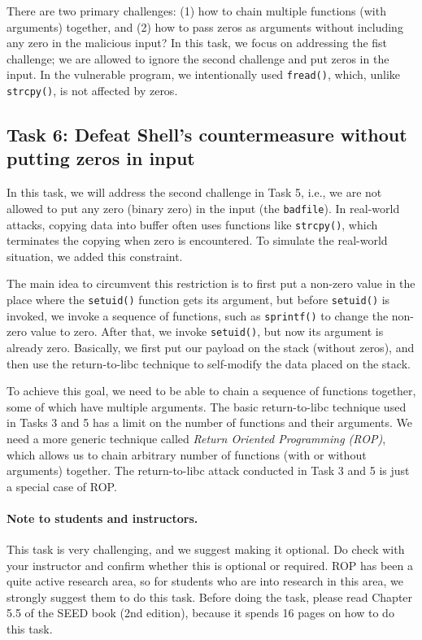 There are two primary challenges: (1) how to 
chain multiple functions (with arguments) together, and (2) how to
pass zeros as arguments without including any zero in the malicious 
input? In this task, we focus on addressing the fist challenge; 
we are allowed to ignore the second challenge and 
put zeros in the input.
In the vulnerable program, we 
intentionally used \texttt{fread()}, which, unlike \texttt{strcpy()},
is not affected by zeros. 



\subsection{Task 6: Defeat Shell's countermeasure without putting zeros in input}


In this task, we will address the second challenge in Task 5, i.e., we are 
not allowed to put any zero (binary zero) 
in the input (the \texttt{badfile}). In real-world attacks,
copying data into buffer often uses functions like \texttt{strcpy()}, which
terminates the copying when zero is encountered. To simulate the real-world
situation, we added this constraint. 

The main idea to circumvent this restriction 
is to first put a non-zero value in the place where
the \texttt{setuid()} function gets its argument, but before 
\texttt{setuid()} is invoked, we invoke a sequence of 
functions, such as \texttt{sprintf()} to change the non-zero
value to zero. After that, we invoke \texttt{setuid()}, but now 
its argument is already zero. Basically, we first put our payload 
on the stack (without zeros), and then use the return-to-libc technique to self-modify
the data placed on the stack. 

To achieve this goal, we need to
be able to chain a sequence of functions together, some of which
have multiple arguments. The basic return-to-libc technique used in Tasks 3 
and 5 has a limit on the number of functions and their arguments. 
We need a more generic technique called 
\textit{Return Oriented Programming (ROP)}, which allows us to 
chain arbitrary number of functions (with or without arguments)
together. The return-to-libc attack conducted in Task 3 and 5 
is just a special case of ROP. 


\paragraph{Note to students and instructors.}
This task is very challenging, and we suggest making it optional. Do check with
your instructor and confirm whether this is optional or required. 
ROP has been a quite active research area, so for students who are into
research in this area, we strongly suggest them to do this task.  
Before doing the task, please read Chapter 5.5 of the SEED book (2nd edition),
because it spends 16 pages on how to do this task. 



